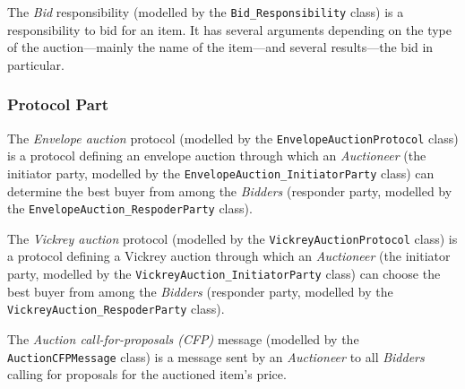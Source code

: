 The \textit{Bid} responsibility (modelled by the \texttt{Bid\_Responsibility} class) is a responsibility to bid for an item.
It has several arguments depending on the type of the auction---mainly the name of the item---and several results---the bid in particular.

\subsubsection*{Protocol Part}

The \textit{Envelope auction} protocol (modelled by the \texttt{EnvelopeAuctionProtocol} class) is a protocol defining an envelope auction through which an \textit{Auctioneer} (the initiator party, modelled by the \texttt{EnvelopeAuction\_InitiatorParty} class) can determine the best buyer from among the \textit{Bidders} (responder party, modelled by the \texttt{EnvelopeAuction\_RespoderParty} class).

The \textit{Vickrey auction} protocol (modelled by the \texttt{VickreyAuctionProtocol} class) is a protocol defining a Vickrey auction through which an \textit{Auctioneer} (the initiator party, modelled by the \texttt{VickreyAuction\_InitiatorParty} class) can choose the best buyer from among the \textit{Bidders} (responder party, modelled by the \texttt{VickreyAuction\_RespoderParty} class).



The \textit{Auction call-for-proposals (CFP)} message (modelled by the \texttt{AuctionCFPMessage} class) is a message sent by an \textit{Auctioneer} to all \textit{Bidders} calling for proposals for the auctioned item's price.

